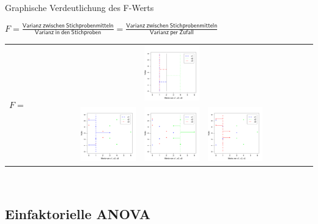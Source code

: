 \begin{frame}
  {Graphische Verdeutlichung des F-Werts}
  
  \begin{center}
    \alert{$F=\frac{\mathsf{Varianz\ zwischen\ Stichprobenmitteln}}{\mathsf{Varianz\ in\ den\ Stichproben}}=\frac{\mathsf{Varianz\ zwischen\ Stichprobenmitteln}}{\mathsf{Varianz\ per\ Zufall}}$}\\
    \begin{tabular}[h!]{cc}
      \multirow{2}{*}{$F=$} & \includegraphics[width=0.2\textwidth]{graphics/anova_var_between} \\\cline{2-2}
      & \includegraphics[width=0.2\textwidth]{graphics/anova_var_x1}\ \raisebox{1.25cm}{+}\ \includegraphics[width=0.2\textwidth]{graphics/anova_var_x2}\ \raisebox{1.25cm}{+}\ \includegraphics[width=0.2\textwidth]{graphics/anova_var_x3} \\
    \end{tabular}\\
    \Zeile
  \end{center}
\end{frame}

\subsection{Einfaktorielle ANOVA}

